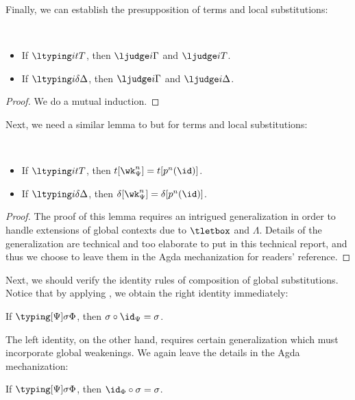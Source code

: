 Finally, we can establish the presupposition of terms and local substitutions:
\begin{lemma}[Presupposition]$ $
  \begin{itemize}
  \item If $\ltyping i t T$, then $\ljudge i \Gamma$ and $\ljudge i T$. 
  \item If $\ltyping i \delta \Delta$, then $\ljudge i \Gamma$ and $\ljudge i \Delta$. 
  \end{itemize}
\end{lemma}
\begin{proof}
  We do a mutual induction.
\end{proof}

Next, we need a similar lemma to  but for terms and local
substitutions:
\begin{lemma} $ $
  \begin{itemize}
  \item If $\ltyping i t T$, then $t[\wk^n_{\Psi}] = t[p^n(\id)]$. 
  \item If $\ltyping i \delta \Delta$, then $\delta[\wk^n_{\Psi}] = \delta[p^n(\id)]$. 
  \end{itemize}
\end{lemma}
\begin{proof}
  The proof of this lemma requires an intrigued generalization in order to handle
  extensions of global contexts due to $\tletbox$ and $\Lambda$. %
  Details of the generalization are technical and too elaborate to put in this
  technical report, and thus we choose to leave them in the Agda mechanization for
  readers' reference. 
\end{proof}

Next, we should verify the identity rules of composition of global substitutions. %
Notice that by applying , we obtain the
right identity immediately:
\begin{lemma}
  If $\typing[\Psi] \sigma \Phi$, then $\sigma \circ \id_{\Psi} = \sigma$. 
\end{lemma}

The left identity, on the other hand, requires certain generalization which
must incorporate global weakenings. %
We again leave the details in the Agda mechanization:
\begin{lemma}
  If $\typing[\Psi] \sigma \Phi$, then $\id_{\Phi} \circ \sigma = \sigma$. 
\end{lemma}


